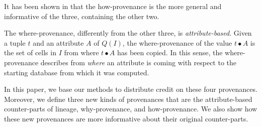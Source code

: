 It has been shown in \citep{CheneyProvSurvey} that the how-provenance is the more general and informative of the three, containing the other two.

The where-provenance, differently from the other three, is \emph{attribute-based}. Given a tuple $t$ and an attribute $A$ of $Q(I)$, the where-provenance of the value $t \bullet A$ is the set of cells in $I$ from where $t \bullet A$ has been copied. In this sense, the where-provenance describes from \emph{where} an attribute is coming with respect to the starting database from which it was computed. 

In this paper, we base our methods to distribute credit on these four provenances. Moreover, we define three new kinds of provenances that are the attribute-based counter-parts of lineage, why-provenance, and how-provenance. We also show how these new provenances are more informative about their original counter-parts. 
